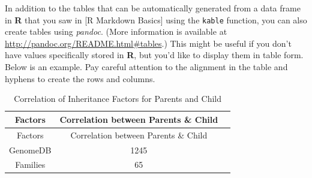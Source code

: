 \documentclass[12pt,twoside]{reedthesis}
\begin{document}
  In addition to the tables that can be automatically generated from a
  data frame in \textbf{R} that you saw in {[}R Markdown Basics{]} using
  the \texttt{kable} function, you can also create tables using
  \emph{pandoc}. (More information is available at
  \url{http://pandoc.org/README.html\#tables}.) This might be useful if
  you don't have values specifically stored in \textbf{R}, but you'd like
  to display them in table form. Below is an example. Pay careful
  attention to the alignment in the table and hyphens to create the rows
  and columns.
  
  \begin{longtable}[]{@{}ccl@{}}
  \caption{Correlation of Inheritance Factors for Parents and Child
  \label{tab:inher}}\tabularnewline
  \toprule
  \begin{minipage}[b]{0.29\columnwidth}\centering\strut
  Factors\strut
  \end{minipage} & \begin{minipage}[b]{0.47\columnwidth}\centering\strut
  Correlation between Parents \& Child\strut
  \end{minipage} & \begin{minipage}[b]{0.16\columnwidth}\raggedright\strut
  \strut
  \end{minipage}\tabularnewline
  \midrule
  \endfirsthead
  \toprule
  \begin{minipage}[b]{0.29\columnwidth}\centering\strut
  Factors\strut
  \end{minipage} & \begin{minipage}[b]{0.47\columnwidth}\centering\strut
  Correlation between Parents \& Child\strut
  \end{minipage} & \begin{minipage}[b]{0.16\columnwidth}\raggedright\strut
  \strut
  \end{minipage}\tabularnewline
  \midrule
  \endhead
  \begin{minipage}[t]{0.29\columnwidth}\centering\strut
  GenomeDB\strut
  \end{minipage} & \begin{minipage}[t]{0.47\columnwidth}\centering\strut
  1245\strut
  \end{minipage} & \begin{minipage}[t]{0.16\columnwidth}\raggedright\strut
  \strut
  \end{minipage}\tabularnewline
  \begin{minipage}[t]{0.29\columnwidth}\centering\strut
  Families\strut
  \end{minipage} & \begin{minipage}[t]{0.47\columnwidth}\centering\strut
  65\strut
  \end{minipage} & \begin{minipage}[t]{0.16\columnwidth}\raggedright\strut
  \strut
  \end{minipage}\tabularnewline
  \bottomrule
  \end{longtable}
  
\end{document}

